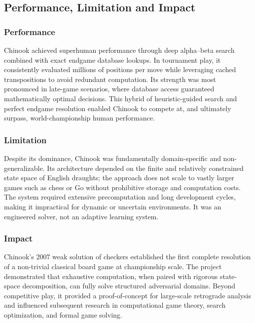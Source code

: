 \documentclass[11pt,a4paper]{report}
\begin{document}
\subsection{Performance, Limitation and Impact}

\subsubsection{Performance}
Chinook achieved superhuman performance through deep alpha–beta search combined with exact endgame database lookups.
In tournament play, it consistently evaluated millions of positions per move while leveraging cached transpositions
to avoid redundant computation. Its strength was most pronounced in late-game scenarios, where database access guaranteed
mathematically optimal decisions. This hybrid of heuristic-guided search and perfect endgame resolution enabled Chinook to
compete at, and ultimately surpass, world-championship human performance.

\subsubsection{Limitation}
Despite its dominance, Chinook was fundamentally domain-specific and non-generalizable. Its architecture depended on
the finite and relatively constrained state space of English draughts; the approach does not scale to vastly larger
games such as chess or Go without prohibitive storage and computation costs. The system required extensive precomputation
and long development cycles, making it impractical for dynamic or uncertain environments. It was an engineered solver,
not an adaptive learning system.

\subsubsection{Impact}
Chinook’s 2007 weak solution of checkers established the first complete resolution of a non-trivial classical board
game at championship scale. The project demonstrated that exhaustive computation, when paired with rigorous
state-space decomposition, can fully solve structured adversarial domains. Beyond competitive play, it provided a
proof-of-concept for large-scale retrograde analysis and influenced subsequent research in computational game
theory, search optimization, and formal game solving.
\end{document}
